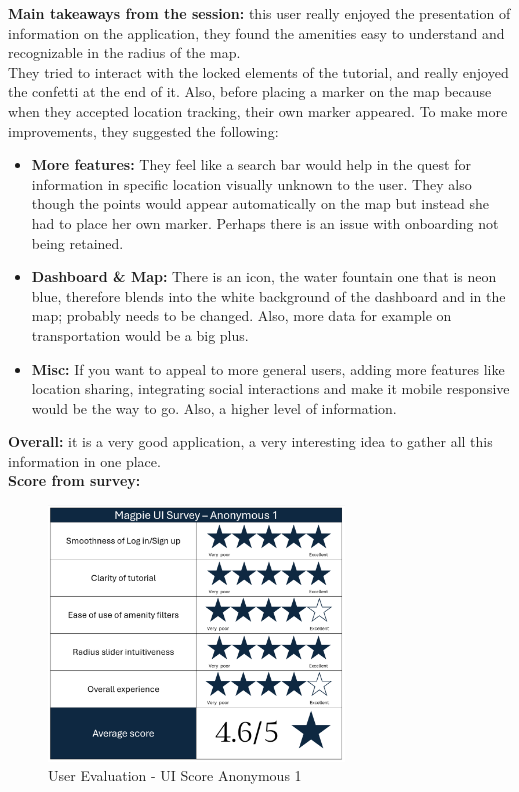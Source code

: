 \noindent\textbf{Main takeaways from the session: } this user really enjoyed the presentation of information on the application, they found the amenities easy to understand and recognizable in the radius of the map.\\
They tried to interact with the locked elements of the tutorial, and really enjoyed the confetti at the end of it. Also, before placing a marker on the map because when they accepted location tracking, their own marker appeared. To make more improvements, they suggested the following:
\begin{itemize}
    \item \textbf{More features: }They feel like a search bar would help in the quest for information in specific location visually unknown to the user. They also though the points would appear automatically on the map but instead she had to place her own marker. Perhaps there is an issue with onboarding not being retained.\\
    \item \textbf{Dashboard \& Map: }There is an icon, the water fountain one that is neon blue, therefore blends into the white background of the dashboard and in the map; probably needs to be changed. Also, more data for example on transportation would be a big plus.\\
    \item \textbf{Misc: } If you want to appeal to more general users, adding more features like location sharing, integrating social interactions and make it mobile responsive would be the way to go. Also, a higher level of information.\\
\end{itemize}
\textbf{Overall: }it is a very good application, a very interesting idea to gather all this information in one place.\\

\noindent\textbf{Score from survey: }
\begin{figure}[h!]
    \centering
    \includegraphics[width=0.7\textwidth]{images/survey-maira.png}
    \caption{User Evaluation - UI Score Anonymous 1}
\end{figure}

